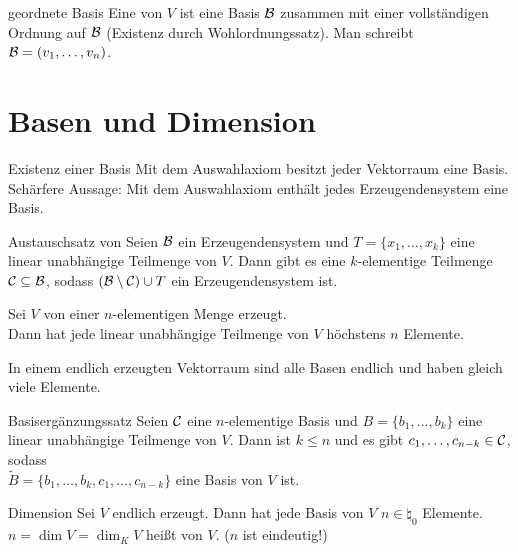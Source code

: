 \begin{Def}{geordnete Basis}
    Eine  von $V$ ist eine Basis $\mathcal{B}$
    zusammen mit einer vollständigen Ordnung auf $\mathcal{B}$
    (Existenz durch Wohlordnungssatz).
    Man schreibt $\mathcal{B} = (v_1, \ldots, v_n)$.
\end{Def}

\section{%
    Basen und Dimension%
}

\begin{Satz}{Existenz einer Basis}
    Mit dem Auswahlaxiom besitzt jeder Vektorraum eine Basis. \\
    Schärfere Aussage: Mit dem Auswahlaxiom enthält jedes Erzeugendensystem
    eine Basis.
\end{Satz}

\begin{Satz}{Austauschsatz von }
    Seien $\mathcal{B}$ ein Erzeugendensystem und $T = \{x_1, \ldots, x_k\}$
    eine linear unabhängige Teilmenge von $V$.
    Dann gibt es eine $k$-elementige Teilmenge
    $\mathcal{C} \subseteq \mathcal{B}$, sodass
    $(\mathcal{B} \setminus \mathcal{C}) \cup T$ ein Erzeugendensystem ist.
\end{Satz}

\begin{Kor}
    Sei $V$ von einer $n$-elementigen Menge erzeugt. \\
    Dann hat jede linear unabhängige Teilmenge von $V$ höchstens $n$ Elemente.
\end{Kor}

\begin{Kor}
    In einem endlich erzeugten Vektorraum sind alle Basen endlich und haben
    gleich viele Elemente.
\end{Kor}

\begin{Satz}{Basisergänzungssatz}
    Seien $\mathcal{C}$ eine $n$-elementige Basis und
    $B = \{b_1, \ldots, b_k\}$ eine linear unabhängige Teilmenge von $V$.
    Dann ist $k \le n$ und es gibt $c_1, \ldots, c_{n-k} \in \mathcal{C}$,
    sodass \\
    $\tilde{B} = \{b_1, \ldots, b_k, c_1, \ldots, c_{n-k}\}$ eine Basis von
    $V$ ist.
\end{Satz}

\begin{Def}{Dimension}
    Sei $V$ endlich erzeugt.
    Dann hat jede Basis von $V$ $n \in \natural_0$ Elemente. \\
    $n = \dim V = \dim_K V$ heißt  von $V$.
    ($n$ ist eindeutig!)
\end{Def}

